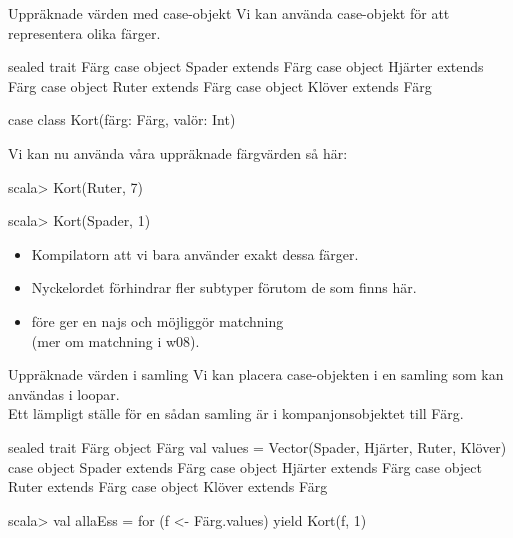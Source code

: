 \begin{Slide}{Uppräknade värden med case-objekt}\SlideFontSmall
Vi kan använda case-objekt för att representera olika färger.
\begin{Code}[language=,keywords={sealed,trait,object,case,class,extends}]
sealed trait Färg
case object Spader  extends Färg
case object Hjärter extends Färg
case object Ruter   extends Färg
case object Klöver  extends Färg

case class Kort(färg: Färg, valör: Int)
\end{Code}

Vi kan nu använda våra uppräknade färgvärden så här:
\begin{REPL}
scala> Kort(Ruter, 7)

scala> Kort(Spader, 1)
\end{REPL}
\begin{itemize}
\item Kompilatorn  att vi bara använder exakt dessa färger.

\item Nyckelordet  förhindrar fler subtyper förutom de som finns här.

\item {} före  ger en najs  och möjliggör matchning \\
(mer om matchning i w08).

\end{itemize}

\end{Slide}

\begin{Slide}{Uppräknade värden i samling}\SlideFontSmall
Vi kan placera case-objekten i en samling som kan användas i loopar. \\ Ett lämpligt ställe för en sådan samling är i kompanjonsobjektet till Färg.
\begin{Code}
sealed trait Färg
object Färg { 
  val values = Vector(Spader, Hjärter, Ruter, Klöver)
}
case object Spader extends Färg
case object Hjärter extends Färg
case object Ruter extends Färg
case object Klöver extends Färg
\end{Code}

\begin{REPL}
scala> val allaEss = for (f <- Färg.values) yield Kort(f, 1)
\end{REPL}
\end{Slide}


